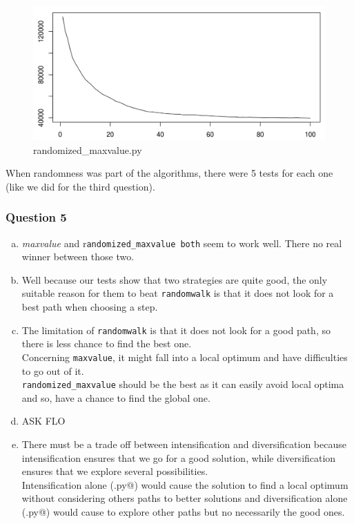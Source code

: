 \documentclass[a4paper,10pt]{article}
\begin{document}
\begin{center}
\begin{figure}[!ht]
		\includegraphics[scale=.4]{randomized_maxvalue.png}
	\caption{randomized\_maxvalue.py}
\end{figure}
\end{center}
When randomness was part of the algorithms, there were 5 tests for each one (like we did for the third question).

\subsubsection{Question 5}
	\begin{enumerate}[(a)]
		\item \textit{maxvalue} and r\texttt{andomized\_maxvalue both} seem to work well. There no real winner between those two.
		\item Well because our tests show that two strategies are quite good, the only suitable reason for them to beat \texttt{randomwalk} is that it does not look for a best path when choosing a step.
		\item The limitation of \texttt{randomwalk} is that it does not look for a good path, so there is less chance to find the best one.\\
		Concerning \texttt{maxvalue}, it might fall into a local optimum {\Huge and have difficulties to go out of it.}\\
		\texttt{randomized\_maxvalue} should be the best as it can easily avoid local optima and so, have a chance to find the global one.
		\item {\Huge ASK FLO}
		\item There must be a trade off between intensification and diversification because intensification ensures that we go for a good solution, while diversification ensures that we explore several possibilities. \\
		Intensification alone (\verb@maxvalue.py@) would cause the solution to find a local optimum without considering others paths to better solutions and diversification alone (\verb@randomwalk.py@) would cause to explore other paths but no necessarily the good ones.
	\end{enumerate}
\end{document}
